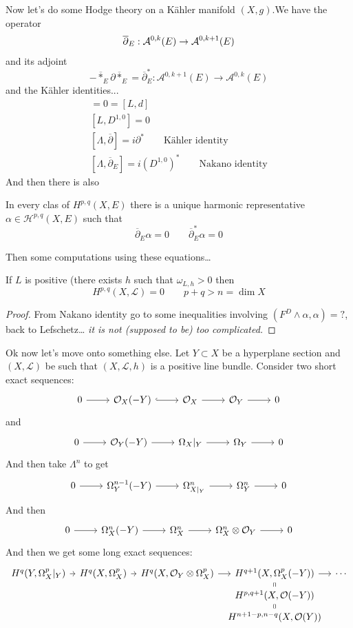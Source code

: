 Now let's do some Hodge theory on a K\"ahler manifold $(X,g)$.We have the operator
\[\overline{\partial}_E:\mathcal{A}^{0,k}(E)\to\mathcal{A}^{0,k+1}(E)\]
and its adjoint
\[-\overline{*}_E\partial\overline{*}_E=\overline{\partial}_E^*:\mathcal{A}^{0,k+1}(E)\to\mathcal{A}^{0,k}(E)\]
and the K\"ahler identities...
\begin{align*}
	[L,d]=0=[L,d]\\
	[L,D^{1,0}]=0\\
	[\Lambda,\overline{\partial}]=i\partial^*\qquad\text{K\"ahler identity} \\
	[\Lambda,\overline{\partial}_E]=i(D^{1,0})^*\qquad\text{Nakano identity}
\end{align*}
And then there is also
\begin{thm}
	In every clas of $H^{p,q}(X,E)$ there is a unique harmonic representative $\alpha\in \mathcal{H}^{p,q}(X,E)$ such that
	\[\overline{\partial}_E\alpha=0\qquad\overline{\partial}_E^*\alpha=0\]
\end{thm}
{\color{magenta}Then some computations using these equations…}

\begin{thm}
	If $L$ is positive (there exists $h$ such that $\omega_{L,h}>0$ then
	\[H^{p,q}(X,\mathcal{L})=0\qquad p+q>n=\dim X\]
\end{thm}
\begin{proof}
	From Nakano identity go to some inequalities involving $(F^D\wedge\alpha,\alpha)=?$, back to Lefschetz… \textit{it is not (supposed to be) too complicated.}
\end{proof}

Ok now let's move onto something else. Let $Y\subset X$ be a hyperplane section and $(X,\mathcal{L})$ be such that $(X,\mathcal{L},h)$ is a positive line bundle. Consider two short exact sequences:
\[\begin{tikzcd}
	0\arrow[r]&\mathcal{O}_X(-Y)\arrow[r,hook]&\mathcal{O}_X\arrow[r]&\mathcal{O}_Y\arrow[r]&0
\end{tikzcd}\]
and
\[\begin{tikzcd}
	0\arrow[r]&\mathcal{O}_Y(-Y)\arrow[r]&\Omega_X|_Y\arrow[r]&\Omega_Y\arrow[r]&0
\end{tikzcd}\]
And then take $\Lambda^n$ to get
\[\begin{tikzcd}
	0\arrow[r]&\Omega^{n-1}_Y(-Y)\arrow[r]&\Omega^n_{X|_Y}\arrow[r]&\Omega^n_Y\arrow[r]&0
\end{tikzcd}\]
And then
\[\begin{tikzcd}
	0\arrow[r]&\Omega^n_X(-Y)\arrow[r]&\Omega^n_X\arrow[r]&\Omega^n_X\otimes\mathcal{O}_Y\arrow[r]&0
\end{tikzcd}\]
And then we get some long exact sequences:
\[\begin{tikzcd}[column sep=tiny,row sep=tiny]
	H^{q}(Y,\Omega^p_X|_Y)\arrow[r]&H^{q}(X,\Omega^p_X)\arrow[r]&H^{q}(X,\mathcal{O}_Y\otimes\Omega^p_X)\arrow[r]&H^{q+1}(X,\Omega^p_X(-Y))\arrow[d,equals]\arrow[r]&\cdots\\
				       &&&H^{p,q+1}(X,\mathcal{O}(-Y))\arrow[d,equals]\\
				       &&&H^{n+1-p,n-q}(X,\mathcal{O}(Y))
\end{tikzcd}\]


